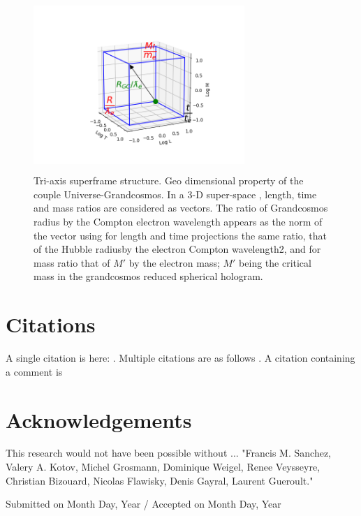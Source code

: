 \documentclass[twoside,draft]{article}
\begin{document}
{\begin{figure}[h]
\centering
\includegraphics[width=8cm,height=6.5cm]{./figures/triaxis.png}
\caption{Tri-axis superframe structure. Geo dimensional property of the couple Universe-Grandcosmos. In a 3-D super-space , length, time and mass ratios are considered as vectors. The ratio of Grandcosmos radius by the Compton electron wavelength appears as the norm of the vector using for length and time projections the same ratio, that of the Hubble radiusby the electron Compton wavelength2, and for mass ratio that of $M\prime$ by the electron mass; $M\prime$ being the critical mass in the grandcosmos reduced spherical hologram. }
\end{figure}

\section{Citations}

A single citation is here: \cite{eddy}. Multiple citations are as follows \cite{bondi,Pez,La2}. A citation containing a comment is \cite[see p.\,5]{eddy}


\section*{Acknowledgements}

This research would not have been possible without ...
"Francis M. Sanchez, Valery A. Kotov, Michel Grosmann, Dominique Weigel, Renee
Veysseyre, Christian Bizouard, Nicolas Flawisky, Denis Gayral, Laurent Gueroult."
%
\begin{flushright}\footnotesize
Submitted on Month Day, Year / Accepted on Month Day, Year
\end{flushright}


}
\end{document}

